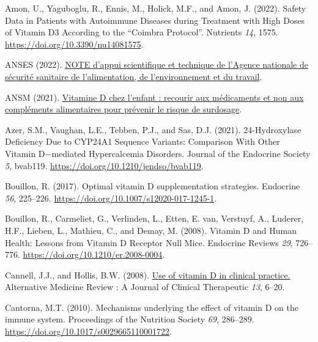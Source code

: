 \documentclass[
  letterpaper,
  DIV=11,
  numbers=noendperiod]{scrartcl}
\newlength{\cslhangindent}
\newlength{\cslentryspacingunit} %
\newenvironment{CSLReferences}[2] %
 {%
  \setlength{\parindent}{0pt}
  \ifodd #1
  \let\oldpar\par
  \def\par{\hangindent=\cslhangindent\oldpar}
  \fi
  \setlength{\parskip}{#2\cslentryspacingunit}
 }%
 {}
\begin{document}
\hypertarget{refs}{}
\begin{CSLReferences}{0}{0}
\leavevmode{}%
Amon, U., Yaguboglu, R., Ennis, M., Holick, M.F., and Amon, J. (2022).
{Safety Data in Patients with Autoimmune Diseases during Treatment with
High Doses of Vitamin D3 According to the {``Coimbra Protocol''}}.
Nutrients \emph{14}, 1575. \url{https://doi.org/10.3390/nu14081575}.

\leavevmode{}%
ANSES (2022).
\href{https://www.anses.fr/fr/system/files/NUT2022AST0099.pdf}{{NOTE
d'appui scientifique et technique de l'Agence nationale de sécurité
sanitaire de l'alimentation, de l'environnement et du travail}}.

\leavevmode{}%
ANSM (2021).
\href{https://ansm.sante.fr/actualites/vitamine-d-chez-lenfant-recourir-aux-medicaments-et-non-aux-complements-alimentaires-pour-prevenir-le-risque-de-surdosage}{{Vitamine
D chez l'enfant : recourir aux médicaments et non aux compléments
alimentaires pour prévenir le risque de surdosage}}.

\leavevmode{}%
Azer, S.M., Vaughan, L.E., Tebben, P.J., and Sas, D.J. (2021).
{24-Hydroxylase Deficiency Due to CYP24A1 Sequence Variants: Comparison
With Other Vitamin D−mediated Hypercalcemia Disorders}. Journal of the
Endocrine Society \emph{5}, bvab119.
\url{https://doi.org/10.1210/jendso/bvab119}.

\leavevmode{}%
Bouillon, R. (2017). {Optimal vitamin D supplementation strategies}.
Endocrine \emph{56}, 225--226.
\url{https://doi.org/10.1007/s12020-017-1245-1}.

\leavevmode{}%
Bouillon, R., Carmeliet, G., Verlinden, L., Etten, E. van, Verstuyf, A.,
Luderer, H.F., Lieben, L., Mathieu, C., and Demay, M. (2008). {Vitamin D
and Human Health: Lessons from Vitamin D Receptor Null Mice}. Endocrine
Reviews \emph{29}, 726--776. \url{https://doi.org/10.1210/er.2008-0004}.

\leavevmode{}%
Cannell, J.J., and Hollis, B.W. (2008).
\href{https://www.ncbi.nlm.nih.gov/pubmed/18377099}{{Use of vitamin D in
clinical practice.}} Alternative Medicine Review : A Journal of Clinical
Therapeutic \emph{13}, 6--20.

\leavevmode{}%
Cantorna, M.T. (2010). {Mechanisms underlying the effect of vitamin D on
the immune system}. Proceedings of the Nutrition Society \emph{69},
286--289. \url{https://doi.org/10.1017/s0029665110001722}.


\end{CSLReferences}
\end{document}
